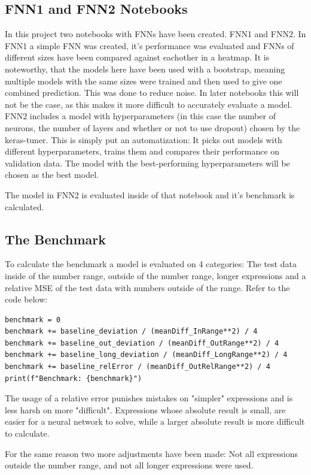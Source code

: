 \documentclass{article}
\begin{document}
\subsection{FNN1 and FNN2 Notebooks}
In this project two notebooks with FNNs have been created. FNN1 and FNN2. 
In FNN1 a simple FNN was created, it's performance was evaluated and FNNs 
of different sizes have been compared against eachother in a heatmap. It is 
noteworthy, that the models here have been used with a bootstrap, meaning 
multiple models with the same sizes were trained and then used to give one 
combined prediction. This was done to reduce noise. In later notebooks this 
will not be the case, as this makes it more difficult to accurately evaluate 
a model.
\\[2em]
FNN2 includes a model with hyperparameters (in this case the number of 
neurons, the number of layers and whether or not to use dropout) chosen by 
the keras-tuner. This is simply put an automatization: It picks out models 
with different hyperparameters, trains them and compares their performance 
on validation data. The model with the best-performing hyperparameters will 
be chosen as the best model.

The model in FNN2 is evaluated inside of that notebook and it's benchmark 
is calculated.

\subsection{The Benchmark}
To calculate the benchmark a model is evaluated on 4 categories: The test 
data inside of the number range, outside of the number range, longer 
expressions and a relative MSE of the test data with numbers outside of the 
range.
Refer to the code below:
\begin{Verbatim}
benchmark = 0
benchmark += baseline_deviation / (meanDiff_InRange**2) / 4
benchmark += baseline_out_deviation / (meanDiff_OutRange**2) / 4
benchmark += baseline_long_deviation / (meanDiff_LongRange**2) / 4
benchmark += baseline_relError / (meanDiff_OutRelRange**2) / 4
print(f"Benchmark: {benchmark}")
\end{Verbatim}

The usage of a relative error punishes mistakes on "simpler" expressions and 
is less harsh on more "difficult". Expressions whose absolute result is 
small, are easier for a neural network to solve, while a larger absolute 
result is more difficult to calculate.

For the same reason two more adjustments have been made:
Not all expressions outside the number range, and not all longer expressions 
were used. 
\end{document}
